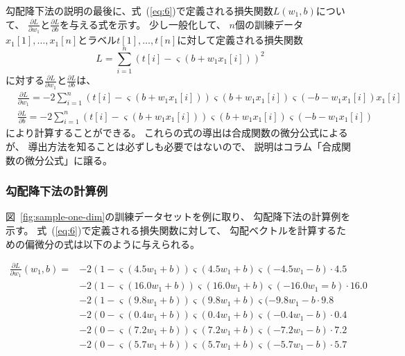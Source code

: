勾配降下法の説明の最後に、式~(\ref{eq:6})で定義される損失関数$L(w_1, b)$について、
$\frac{\partial L}{\partial w_1}$と$\frac{\partial L}{\partial b}$を与える式を示す。
少し一般化して、
$n$個の訓練データ$x_1[1], \dots, x_1[n]$とラベル$t[1], \dots, t[n]$に対して定義される損失関数
\[
  L = \sum_{i=1}^n \left(t[i] - \varsigma(b + w_1 x_1[i])\right)^2
\]
に対する$\frac{\partial L}{\partial w_1}$と$\frac{\partial L}{\partial b}$は、
\begin{align}
  &\label{eq:18}
    \frac{\partial L}{\partial w_1} = -2 \sum_{i=1}^n
    \left(t[i] - \varsigma(b + w_1 x_1[i])\right)\varsigma(b + w_1 x_1[i])\varsigma(- b - w_1 x_1[i]) x_1[i]
  \\&\label{eq:19}
    \frac{\partial L}{\partial b} = -2 \sum_{i=1}^n
    \left(t[i] - \varsigma(b + w_1 x_1[i])\right)\varsigma(b + w_1 x_1[i])\varsigma(- b - w_1 x_1[i])
\end{align}
により計算することができる。
これらの式の導出は合成関数の微分公式によるが、
導出方法を知ることは必ずしも必要ではないので、
説明はコラム「合成関数の微分公式」に譲る。

\subsubsection{勾配降下法の計算例}
\label{sec:example-grad-descent}

図~\ref{fig:sample-one-dim}の訓練データセットを例に取り、
勾配降下法の計算例を示す。
式~(\ref{eq:6})で定義される損失関数に対して、
勾配ベクトルを計算するための偏微分の式は以下のように与えられる。

\begin{align}
  \frac{\partial L}{\partial w_1}(w_1, b) =
  &\nonumber
    -2 \left(1 - \varsigma(4.5 w_1 + b)\right)\varsigma(4.5 w_1 + b)\varsigma(- 4.5 w_1 - b)\cdot 4.5
  \\&\nonumber
  -2 \left(1 - \varsigma(16.0 w_1 + b)\right) \varsigma(16.0 w_1 + b)\varsigma(- 16.0 w_1 = b)\cdot 16.0
  \\&\nonumber
  -2 \left(1 - \varsigma(9.8 w_1 + b)\right)\varsigma(9.8 w_1 + b)\varsigma(- 9.8 w_1 - b\cdot 9.8
  \\&\nonumber
  -2 \left(0 - \varsigma(0.4 w_1 + b)\right)\varsigma(0.4 w_1 + b)\varsigma(- 0.4 w_1 - b)\cdot 0.4
  \\&\nonumber
  -2 \left(0 - \varsigma(7.2 w_1 + b)\right)\varsigma(7.2 w_1 + b)\varsigma(- 7.2 w_1 - b)\cdot 7.2
  \\&\label{eq:14}
  -2 \left(0 - \varsigma(5.7 w_1 + b)\right)\varsigma(5.7 w_1 + b)\varsigma(- 5.7 w_1 - b)\cdot 5.7
\end{align}

